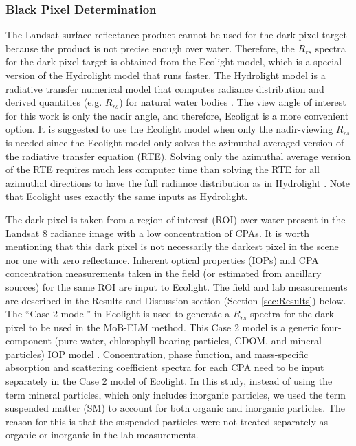 \documentclass[onecolumn,3p,letterpaper,11pt]{elsarticle}
\begin{document}
\subsubsection{Black Pixel Determination}
\label{subsubsec:blackpixel}

The Landsat surface reflectance product cannot be used for the dark pixel target because the product is not precise enough over water. Therefore, the $R_{rs}$ spectra for the dark pixel target is obtained from the Ecolight model, which is a special version of the Hydrolight model that runs faster. The Hydrolight model is a radiative transfer numerical model that computes radiance distribution and derived quantities (e.g. $R_{rs}$) for natural water bodies \citep{MobleyHE}. The view angle of interest for this work is only the nadir angle, and therefore, Ecolight is a more convenient option. It is suggested to use the Ecolight model when only the nadir-viewing $R_{rs}$ is needed since the Ecolight model only solves the azimuthal averaged version of the radiative transfer equation (RTE). Solving only the azimuthal average version of the RTE requires much less computer time than solving the RTE for all azimuthal directions to have the full radiance distribution as in Hydrolight \citep{MobleyHE}. Note that Ecolight uses exactly the same inputs as Hydrolight.

The dark pixel is taken from a region of interest (ROI) over water present in the Landsat 8 radiance image with a low concentration of CPAs. It is worth mentioning that this dark pixel is not necessarily the darkest pixel in the scene nor one with zero reflectance. Inherent optical properties (IOPs) and CPA concentration measurements taken in the field (or estimated from ancillary sources) for the same ROI are input to Ecolight. The field and lab measurements are described in the Results and Discussion section (Section \ref{sec:Results}) below. The ``Case 2 model'' in Ecolight is used to generate a $R_{rs}$ spectra for the dark pixel to be used in the MoB-ELM method. This Case 2 model is a generic four-component (pure water, chlorophyll-bearing particles, CDOM, and mineral particles) IOP model \citep{MobleyHEtech}. Concentration, phase function, and mass-specific absorption and scattering coefficient spectra for each CPA need to be input separately in the Case 2 model of Ecolight. In this study, instead of using the term mineral particles, which only includes inorganic particles, we used the term suspended matter (SM) to account for both organic and inorganic particles. The reason for this is that the suspended particles were not treated separately as organic or inorganic in the lab measurements.
\end{document}
